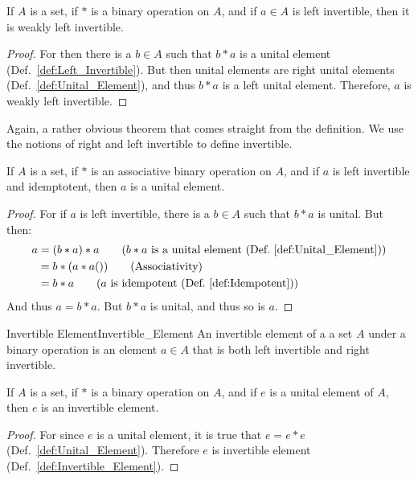     \begin{theorem}
        If $A$ is a set, if $*$ is a binary operation on $A$, and if $a\in{A}$
        is left invertible, then it is weakly left invertible.
    \end{theorem}
    \begin{proof}
        For then there is a $b\in{A}$ such that $b*a$ is a unital element
        (Def.~\ref{def:Left_Invertible}). But then unital elements are
        right unital elements (Def.~\ref{def:Unital_Element}), and thus $b*a$
        is a left unital element. Therefore, $a$ is weakly left invertible.
    \end{proof}
    Again, a rather obvious theorem that comes straight from the definition.
    We use the notions of right and left invertible to define invertible.
    \begin{theorem}
        \label{thm:assoc_left_idem_inv_is_unit}%
        If $A$ is a set, if $*$ is an associative binary operation on $A$, and
        if $a$ is left invertible and idemptotent, then $a$ is a unital element.
    \end{theorem}
    \begin{proof}
        For if $a$ is left invertible, there is a $b\in{A}$ such that $b*a$ is
        unital. But then:
        \begin{align}
            a&=(b*a)*a
            \tag{$b*a$ is a unital element (Def.~\ref{def:Unital_Element})}\\
            &=b*(a*a())
            \tag{Associativity}\\
            &=b*a
            \tag{$a$ is idempotent (Def.~\ref{def:Idempotent})}
        \end{align}
        And thus $a=b*a$. But $b*a$ is unital, and thus so is $a$.
    \end{proof}
    \begin{fdefinition}{Invertible Element}{Invertible_Element}
        An invertible element of a a \gls{set} $A$ under a
        \gls{binary operation} is an element $a\in{A}$ that is both
        left invertible and right invertible.
    \end{fdefinition}
    \begin{theorem}
        \label{thm:Unital_Elements_Are_Invertible}%
        If $A$ is a set, if $*$ is a binary operation on $A$, and if $e$ is a
        unital element of $A$, then $e$ is an invertible element.
    \end{theorem}
    \begin{proof}
        For since $e$ is a unital element, it is true that $e=e*e$
        (Def.~\ref{def:Unital_Element}). Therefore $e$ is invertible element
        (Def.~\ref{def:Invertible_Element}).
    \end{proof}
